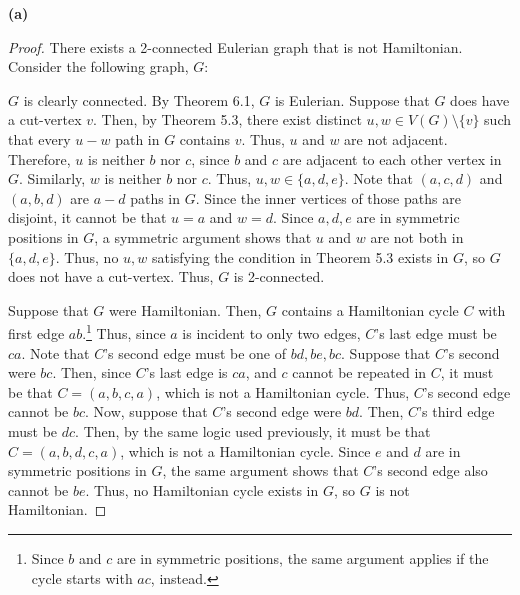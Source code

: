 \documentclass[12pt]{article}
\begin{document}
\newpage{}

{\bf (a)}
\begin{proof} There exists a 2-connected Eulerian graph that is not Hamiltonian.
	Consider the following graph, $G$:
	\begin{center}
	\end{center}

	$G$ is clearly connected.
	By Theorem 6.1, $G$ is Eulerian.
	Suppose that $G$ does have a cut-vertex $v$.
	Then, by Theorem 5.3, there exist distinct $u,w \in V(G) \setminus \{v\}$ such that every $u-w$ path in $G$ contains $v$.
	Thus, $u$ and $w$ are not adjacent.
	Therefore, $u$ is neither $b$ nor $c$, since $b$ and $c$ are adjacent to each other vertex in $G$.
	Similarly, $w$ is neither $b$ nor $c$.
	Thus, $u,w \in \{a,d,e\}$.
	Note that $(a,c,d)$ and $(a,b,d)$ are $a-d$ paths in $G$.
	Since the inner vertices of those paths are disjoint, it cannot be that $u = a$ and $w = d$.
	Since $a, d, e$ are in symmetric positions in $G$, a symmetric argument shows that $u$ and $w$ are not both in $\{a,d,e\}$.
	Thus, no $u,w$ satisfying the condition in Theorem 5.3 exists in $G$, so $G$ does not have a cut-vertex.
	Thus, $G$ is 2-connected.

	Suppose that $G$ were Hamiltonian.
	Then, $G$ contains a Hamiltonian cycle $C$ with first edge $ab$.\footnote{Since $b$ and $c$ are in symmetric positions, the same argument applies if the cycle starts with $ac$, instead.}
	Thus, since $a$ is incident to only two edges, $C$'s last edge must be $ca$.
	Note that $C$'s second edge must be one of $bd, be, bc$.
	Suppose that $C$'s second were $bc$.
	Then, since $C$'s last edge is $ca$, and $c$ cannot be repeated in $C$, it must be that $C = (a, b, c, a)$, which is not a Hamiltonian cycle.
	Thus, $C$'s second edge cannot be $bc$.
	Now, suppose that $C$'s second edge were $bd$.
	Then, $C$'s third edge must be $dc$.
	Then, by the same logic used previously, it must be that $C = (a, b, d, c, a)$, which is not a Hamiltonian cycle.
	Since $e$ and $d$ are in symmetric positions in $G$, the same argument shows that $C$'s second edge also cannot be $be$.
	Thus, no Hamiltonian cycle exists in $G$, so $G$ is not Hamiltonian.
\end{proof}
\end{document}
